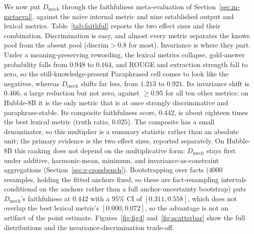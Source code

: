 We now put $D_\text{mech}$ through the faithfulness meta-evaluation of Section~\ref{sec:m-metaeval},
against the na\"ive internal metric and nine established output and lexical metrics.
Table~\ref{tab:faithful} reports the two effect sizes and their combination. Discrimination is easy, and
almost every metric separates the knows pool from the absent pool ($\text{discrim} > 0.8$ for most).
Invariance is where they part. Under a meaning-preserving rewording, the lexical metrics collapse, 
gold-answer probability falls from $0.948$ to $0.164$, and ROUGE and extraction strength fall to zero,
so the still-knowledge-present Paraphrased cell comes to look like the negatives, whereas $D_\text{mech}$
shifts far less, from $1.213$ to $0.921$. Its invariance shift is $0.466$, a large reduction but not zero,
against $\geq 0.95$ for all ten other metrics; on Hubble-8B it is the only metric that is at once strongly
discriminative and paraphrase-stable. Its composite faithfulness score, $0.442$, is about eighteen times the
best lexical metric (truth ratio, $0.025$). The composite has a small denominator, so this multiplier is a
summary statistic rather than an absolute unit; the primary evidence is the two effect sizes, reported
separately. On Hubble-8B this ranking does not depend on the multiplicative form: $D_\text{mech}$ stays
first under additive, harmonic-mean, minimum, and invariance-as-constraint aggregations
(Section~\ref{sec:r-crossbench}). Bootstrapping over facts ($4000$ resamples, holding the fitted anchors
fixed, so these are fact-resampling intervals conditional on the anchors rather than a full anchor-uncertainty
bootstrap) puts $D_\text{mech}$'s faithfulness at $0.442$ with a $95\%$ CI of $[0.311, 0.558]$, which does
not overlap the best lexical metric's $[0.000, 0.072]$, so the advantage is not an artifact of the point
estimate. Figures~\ref{fig:fig4} and~\ref{fig:scatterbar} show the full distributions and the
invariance-discrimination trade-off.

